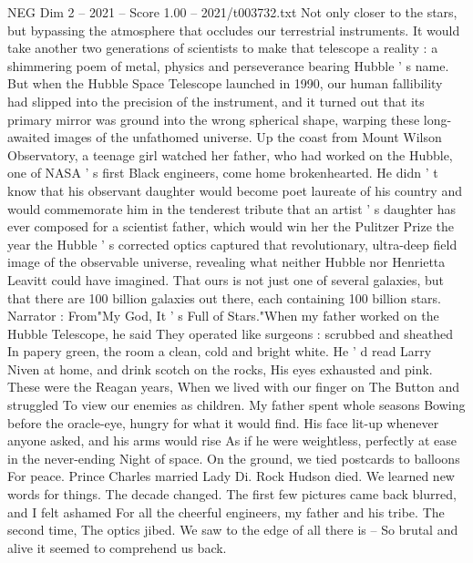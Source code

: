 \begin{textsample}{NEG Dim 2 – 2021 – Score 1.00 – 2021/t003732.txt}
Not only closer to the stars, but bypassing the atmosphere that occludes our terrestrial instruments.
It would take another two generations of scientists to make that telescope a reality : a shimmering poem of metal, physics and perseverance bearing Hubble ' s name.
But when the Hubble Space Telescope launched in 1990, our human fallibility had slipped into the precision of the instrument, and it turned out that its primary mirror was ground into the wrong spherical shape, warping these long-awaited images of the unfathomed universe.
Up the coast from Mount Wilson Observatory, a teenage girl watched her father, who had worked on the Hubble, one of NASA ' s first Black engineers, come home brokenhearted.
He didn ' t know that his observant daughter would become poet laureate of his country and would commemorate him in the tenderest tribute that an artist ' s daughter has ever composed for a scientist father, which would win her the Pulitzer Prize the year the Hubble ' s corrected optics captured that revolutionary, ultra-deep field image of the observable universe, revealing what neither Hubble nor Henrietta Leavitt could have imagined.
That ours is not just one of several galaxies, but that there are 100 billion galaxies out there, each containing 100 billion stars.
Narrator : From"My God, It ' s Full of Stars."When my father worked on the Hubble Telescope, he said They operated like surgeons : scrubbed and sheathed In papery green, the room a clean, cold and bright white.
He ' d read Larry Niven at home, and drink scotch on the rocks, His eyes exhausted and pink.
These were the Reagan years, When we lived with our finger on The Button and struggled To view our enemies as children.
My father spent whole seasons Bowing before the oracle-eye, hungry for what it would find.
His face lit-up whenever anyone asked, and his arms would rise As if he were weightless, perfectly at ease in the never-ending Night of space.
On the ground, we tied postcards to balloons For peace.
Prince Charles married Lady Di.
Rock Hudson died.
We learned new words for things.
The decade changed.
The first few pictures came back blurred, and I felt ashamed For all the cheerful engineers, my father and his tribe.
The second time, The optics jibed.
We saw to the edge of all there is -- So brutal and alive it seemed to comprehend us back.

\end{textsample}
